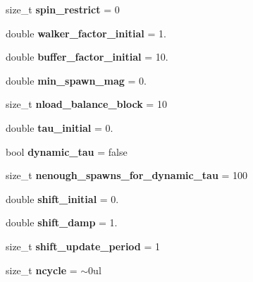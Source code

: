 \begin{DoxyCompactItemize}
\item 
size\+\_\+t {\bfseries spin\+\_\+restrict} = 0\hypertarget{structOptions_a460b879fcd7be40fd050c0d96c61da8b}{}\label{structOptions_a460b879fcd7be40fd050c0d96c61da8b}

\item 
double {\bfseries walker\+\_\+factor\+\_\+initial} = 1.\hypertarget{structOptions_a139542906a2259097fd24d6f31833958}{}\label{structOptions_a139542906a2259097fd24d6f31833958}

\item 
double {\bfseries buffer\+\_\+factor\+\_\+initial} = 10.\hypertarget{structOptions_a3db887fde775febbe42fcf7ba93f81f1}{}\label{structOptions_a3db887fde775febbe42fcf7ba93f81f1}

\item 
double {\bfseries min\+\_\+spawn\+\_\+mag} = 0.\hypertarget{structOptions_a2aa1c1c9faa0989a6c95dcc289cdaae6}{}\label{structOptions_a2aa1c1c9faa0989a6c95dcc289cdaae6}

\item 
size\+\_\+t {\bfseries nload\+\_\+balance\+\_\+block} = 10\hypertarget{structOptions_a95d90ea542bd2e2de5540f10c56047b8}{}\label{structOptions_a95d90ea542bd2e2de5540f10c56047b8}

\item 
double {\bfseries tau\+\_\+initial} = 0.\hypertarget{structOptions_a522a02e97c1ab8efd230123498aa910e}{}\label{structOptions_a522a02e97c1ab8efd230123498aa910e}

\item 
bool {\bfseries dynamic\+\_\+tau} = false\hypertarget{structOptions_a2a63413b244620e106cbb9050a500151}{}\label{structOptions_a2a63413b244620e106cbb9050a500151}

\item 
size\+\_\+t {\bfseries nenough\+\_\+spawns\+\_\+for\+\_\+dynamic\+\_\+tau} = 100\hypertarget{structOptions_ac65321da4d90e62312b14deef5e73091}{}\label{structOptions_ac65321da4d90e62312b14deef5e73091}

\item 
double {\bfseries shift\+\_\+initial} = 0.\hypertarget{structOptions_aaaf04126a747fc2ca8397d41582c4225}{}\label{structOptions_aaaf04126a747fc2ca8397d41582c4225}

\item 
double {\bfseries shift\+\_\+damp} = 1.\hypertarget{structOptions_a99b534fe4dfb45d7024946fd90336391}{}\label{structOptions_a99b534fe4dfb45d7024946fd90336391}

\item 
size\+\_\+t {\bfseries shift\+\_\+update\+\_\+period} = 1\hypertarget{structOptions_a89e6b9e6af2ee53e84ce45fb197646c1}{}\label{structOptions_a89e6b9e6af2ee53e84ce45fb197646c1}

\item 
size\+\_\+t {\bfseries ncycle} = $\sim$0ul\hypertarget{structOptions_a235fab0b58c5c9f231c5cc8ed97fac02}{}\label{structOptions_a235fab0b58c5c9f231c5cc8ed97fac02}

\end{DoxyCompactItemize}


